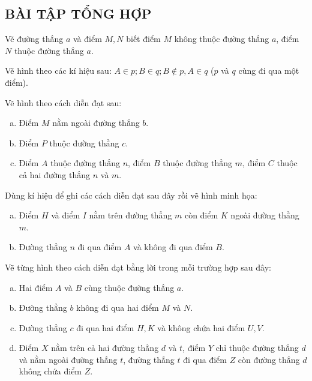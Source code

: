 \begin{bt}
\subsection{BÀI TẬP TỔNG HỢP}
\end{bt}   \begin{bt}
Vẽ đường thẳng $a$ và điểm $M, N$ biết điểm $M$ không thuộc đường thẳng $a$,  điểm $N$ thuộc đường thẳng $a$.
\end{bt}   \begin{bt}
Vẽ hình theo các kí hiệu sau:
$A\in p;B\in q;B\notin p,A\in q$ ($p$ và $q$ cùng đi qua một điểm).
\end{bt}   \begin{bt}
Vẽ hình theo cách diễn đạt sau:
\begin{enumerate}[a)]
\item	Điểm $M$ nằm ngoài đường thẳng $b$.
\item	Điểm $P$ thuộc đường thẳng $c$.
\item	Điểm $A$ thuộc đường thẳng $n$, điểm $B$ thuộc đường thẳng $m$, điểm $C$ thuộc cả hai đường thẳng $n$ và $m$.
\end{enumerate}
\end{bt}   \begin{bt}
Dùng kí hiệu để ghi các cách diễn đạt sau đây rồi vẽ hình minh họa:
\begin{enumerate}[a)]
\item	Điểm $H$ và điểm $I$ nằm trên đường thẳng $m$ còn điểm $K$ ngoài đường thẳng $m$.
\item	Đường thẳng $n$ đi qua điểm $A$ và không đi qua điểm $B$.
\end{enumerate}
\end{bt}   \begin{bt}
Vẽ từng hình theo cách diễn đạt bằng lời trong mỗi trường hợp sau đây:
\begin{enumerate}[a)]
\item	Hai điểm $A$ và $B$ cùng thuộc đường thẳng $a$.
\item	Đường thẳng $b$ không đi qua hai điểm $M$ và $N$.
\item	Đường thẳng $c$ đi qua hai điểm $H, K$ và không chứa hai điểm $U, V$.
\item	Điểm $X$ nằm trên cả hai đường thẳng $d$ và $t$, điểm $Y$ chỉ thuộc đường thẳng $d$ và nằm ngoài đường thẳng $t$, đường thẳng $t$ đi qua điểm $Z$ còn đường thẳng $d$ không chứa điểm $Z$.
\end{enumerate}
\end{bt} 